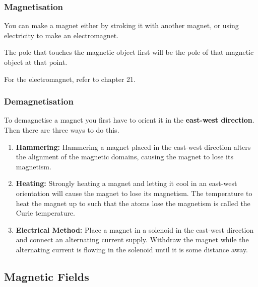 \documentclass[../main.tex]{subfiles}
\begin{document}
	\subsubsection{Magnetisation}
	You can make a magnet either by stroking it with another magnet, or using electricity to make an electromagnet.
	\begin{center}
	\end{center}
	The pole that touches the magnetic object first will be the pole of that magnetic object at that point.
	
	For the electromagnet, refer to chapter 21.
	
	\subsubsection{Demagnetisation}
	To demagnetise a magnet you first have to orient it in the \textbf{east-west direction}. Then there are three ways to do this.
	\begin{enumerate}
		\item \textbf{Hammering:} Hammering a magnet placed in the east-west direction alters the alignment of the magnetic domains, causing the magnet to lose its magnetism.
		\item \textbf{Heating:} Strongly heating a magnet and letting it cool in an east-west orientation will cause the magnet to lose its magnetism. The temperature to heat the magnet up to such that the atoms lose the magnetism is called the Curie temperature.
		\item \textbf{Electrical Method:} Place a magnet in a solenoid in the east-west direction and connect an alternating current supply. Withdraw the magnet while the alternating current is flowing in the solenoid until it is some distance away.
	\end{enumerate}

	\subsection{Magnetic Fields}
\end{document}
